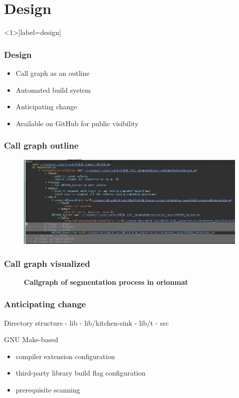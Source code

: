 \section{Design}

\begin{frame}<1>[label=design]\frametitle{Design}
\begin{itemize}
	\item<1> Call graph as an outline
	\item<2> Automated build system
	\item<3> Anticipating change
	\item<3> Available on GitHub for public visibility
\end{itemize}
\end{frame}

\begin{frame}\frametitle{Call graph outline}
\begin{figure}
\centering
\includegraphics[width=1.0\textwidth]{gfx/call-graph-outline}
\end{figure}
\end{frame}

\begin{frame}\frametitle{Call graph visualized}
\begin{figure}
\centering
\resizebox{0.8\textwidth}{!}{}
\caption[Callgraph of segmentation process in ]{
\textbf{\boldmath{} Callgraph of segmentation process in \gls{orionmat}}
}\label{fig:orionmat-segmentation}
\end{figure}
\end{frame}



\begin{frame}\frametitle{Anticipating change}
	Directory structure
- lib
- lib/kitchen-sink
- lib/t
- src
\end{frame}

\begin{frame}
	GNU Make-based 
	\begin{itemize}
		\item compiler extension configuration
		\item third-party library build flag configuration
		\item prerequisite scanning
	\end{itemize}
\end{frame}



